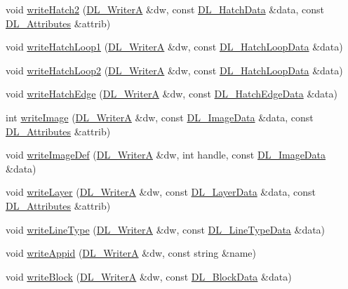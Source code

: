 \begin{DoxyCompactItemize}
\item 
void \hyperlink{classDL__Jww_a77d8dc4678f6c7fb803a8d106044714a}{write\-Hatch2} (\hyperlink{classDL__WriterA}{D\-L\-\_\-\-Writer\-A} \&dw, const \hyperlink{structDL__HatchData}{D\-L\-\_\-\-Hatch\-Data} \&data, const \hyperlink{classDL__Attributes}{D\-L\-\_\-\-Attributes} \&attrib)
\item 
void \hyperlink{classDL__Jww_a84fec96772112d1a9e67695b015f4459}{write\-Hatch\-Loop1} (\hyperlink{classDL__WriterA}{D\-L\-\_\-\-Writer\-A} \&dw, const \hyperlink{structDL__HatchLoopData}{D\-L\-\_\-\-Hatch\-Loop\-Data} \&data)
\item 
void \hyperlink{classDL__Jww_afe5795107046cbdecdbfc6d69c490827}{write\-Hatch\-Loop2} (\hyperlink{classDL__WriterA}{D\-L\-\_\-\-Writer\-A} \&dw, const \hyperlink{structDL__HatchLoopData}{D\-L\-\_\-\-Hatch\-Loop\-Data} \&data)
\item 
void \hyperlink{classDL__Jww_ab468fed13399e34742fe9b5cc7115c1c}{write\-Hatch\-Edge} (\hyperlink{classDL__WriterA}{D\-L\-\_\-\-Writer\-A} \&dw, const \hyperlink{structDL__HatchEdgeData}{D\-L\-\_\-\-Hatch\-Edge\-Data} \&data)
\item 
int \hyperlink{classDL__Jww_a16a70594a388162ca074ee82f6046425}{write\-Image} (\hyperlink{classDL__WriterA}{D\-L\-\_\-\-Writer\-A} \&dw, const \hyperlink{structDL__ImageData}{D\-L\-\_\-\-Image\-Data} \&data, const \hyperlink{classDL__Attributes}{D\-L\-\_\-\-Attributes} \&attrib)
\item 
void \hyperlink{classDL__Jww_a9b3c239e7248cb80e9a573aabf0ce806}{write\-Image\-Def} (\hyperlink{classDL__WriterA}{D\-L\-\_\-\-Writer\-A} \&dw, int handle, const \hyperlink{structDL__ImageData}{D\-L\-\_\-\-Image\-Data} \&data)
\item 
void \hyperlink{classDL__Jww_a147c0555f8b63c23a1bcafd5a44b8f38}{write\-Layer} (\hyperlink{classDL__WriterA}{D\-L\-\_\-\-Writer\-A} \&dw, const \hyperlink{structDL__LayerData}{D\-L\-\_\-\-Layer\-Data} \&data, const \hyperlink{classDL__Attributes}{D\-L\-\_\-\-Attributes} \&attrib)
\item 
void \hyperlink{classDL__Jww_a7978c1b58bc2b681e1b759e210ae8dad}{write\-Line\-Type} (\hyperlink{classDL__WriterA}{D\-L\-\_\-\-Writer\-A} \&dw, const \hyperlink{structDL__LineTypeData}{D\-L\-\_\-\-Line\-Type\-Data} \&data)
\item 
void \hyperlink{classDL__Jww_a764515ba3869e0caef71cb431a707b3e}{write\-Appid} (\hyperlink{classDL__WriterA}{D\-L\-\_\-\-Writer\-A} \&dw, const string \&name)
\item 
void \hyperlink{classDL__Jww_a2604a086785c870ea6b0f0710b7fca3a}{write\-Block} (\hyperlink{classDL__WriterA}{D\-L\-\_\-\-Writer\-A} \&dw, const \hyperlink{structDL__BlockData}{D\-L\-\_\-\-Block\-Data} \&data)

\end{DoxyCompactItemize}
